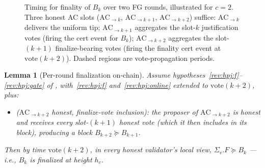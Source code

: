 \documentclass{article}
\newcommand{\vote}{\ensuremath{\mathrm{vote}}}
\theoremstyle{plain}
\newtheorem{lemma}{Lemma}
\theoremstyle{definition}
\theoremstyle{remark}
\begin{document}
\begin{figure}[H]
\caption{Timing for finality of $B_k$ over two FG rounds, illustrated for $c = 2$. Three honest AC slots ($\mathrm{AC}_{\to k}$, $\mathrm{AC}_{\to k+1}$, $\mathrm{AC}_{\to k+2}$) suffice: $\mathrm{AC}_{\to k}$ delivers the uniform tip; $\mathrm{AC}_{\to k+1}$ aggregates the slot-$k$ justification votes (firing the cert event for $B_k$); $\mathrm{AC}_{\to k+2}$ aggregates the slot-$(k+1)$ finalize-bearing votes (firing the finality cert event at $\vote(k+2)$). Dashed regions are vote-propagation periods.}\label{fig:per-round-finality-timing}
\begin{center}
\end{center}
\end{figure}

\begin{lemma}[Per-round finalization on-chain]\label{lem:per-round-finalization}
Assume hypotheses~\ref{rev:hpj:f}--\ref{rev:hpj:gate} of , with~\ref{rev:hpj:f} and~\ref{rev:hpj:online} extended to $\vote(k+2)$, plus:
\begin{itemize}
  \item[\textnormal{(9)}]\label{rev:hpf:ack2-honest} \emph{($\mathrm{AC}_{\to k+2}$ honest, finalize-vote inclusion):} the proposer of $\mathrm{AC}_{\to k+2}$ is honest and receives every slot-$(k+1)$ honest vote (which it then includes in its block), producing a block $B_{k+2} \succeq B_{k+1}$.
\end{itemize}

Then by time $\vote(k+2)$, in every honest validator's local view, $\Sigma_v.F \succeq B_k$ --- i.e., $B_k$ is finalized at height $h_c$.
\end{lemma}
\end{document}
